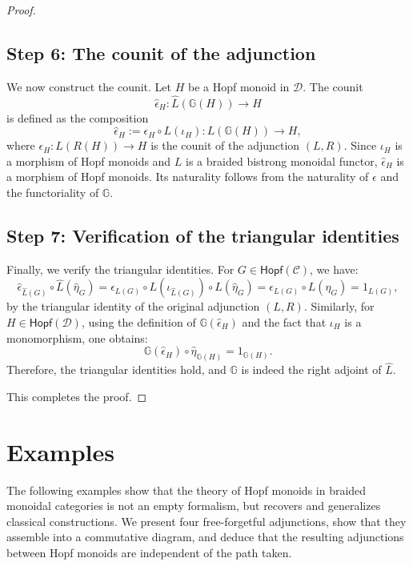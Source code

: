 \documentclass{amsart}
\begin{document}
\begin{proof}
\subsection*{Step 6: The counit of the adjunction}

We now construct the counit. Let $H$ be a Hopf monoid in $\mathcal{D}$. The counit
\[
\widehat{\epsilon}_H \colon \widehat{L}(\mathbb{G}(H)) \longrightarrow H
\]
is defined as the composition
\[
\widehat{\epsilon}_H := \epsilon_H \circ L(\iota_H) \colon L(\mathbb{G}(H)) \longrightarrow H,
\]
where $\epsilon_H \colon L(R(H)) \longrightarrow H$ is the counit of the adjunction $(L, R)$. Since $\iota_H$ is a morphism of Hopf monoids and $L$ is a braided bistrong monoidal functor, $\widehat{\epsilon}_H$ is a morphism of Hopf monoids. Its naturality follows from the naturality of $\epsilon$ and the functoriality of $\mathbb{G}$.

\subsection*{Step 7: Verification of the triangular identities}

Finally, we verify the triangular identities. For $G \in \mathsf{Hopf}(\mathcal{C})$, we have:
\[
\widehat{\epsilon}_{\widehat{L}(G)} \circ \widehat{L}(\widehat{\eta}_G)
= \epsilon_{L(G)} \circ L(\iota_{\widehat{L}(G)}) \circ L(\widehat{\eta}_G)
= \epsilon_{L(G)} \circ L(\eta_G)
= 1_{L(G)},
\]
by the triangular identity of the original adjunction $(L, R)$. Similarly, for $H \in \mathsf{Hopf}(\mathcal{D})$, using the definition of $\mathbb{G}(\widehat{\epsilon}_H)$ and the fact that $\iota_H$ is a monomorphism, one obtains:
\[
\mathbb{G}(\widehat{\epsilon}_H) \circ \widehat{\eta}_{\mathbb{G}(H)} = 1_{\mathbb{G}(H)}.
\]
Therefore, the triangular identities hold, and $\mathbb{G}$ is indeed the right adjoint of $\widehat{L}$.

This completes the proof.
\end{proof}

\section{Examples}\label{sec:examples}

The following examples show that the theory of Hopf monoids in braided monoidal categories is not an empty formalism, but recovers and generalizes classical constructions. We present four free-forgetful adjunctions, show that they assemble into a commutative diagram, and deduce that the resulting adjunctions between Hopf monoids are independent of the path taken.
\end{document}
